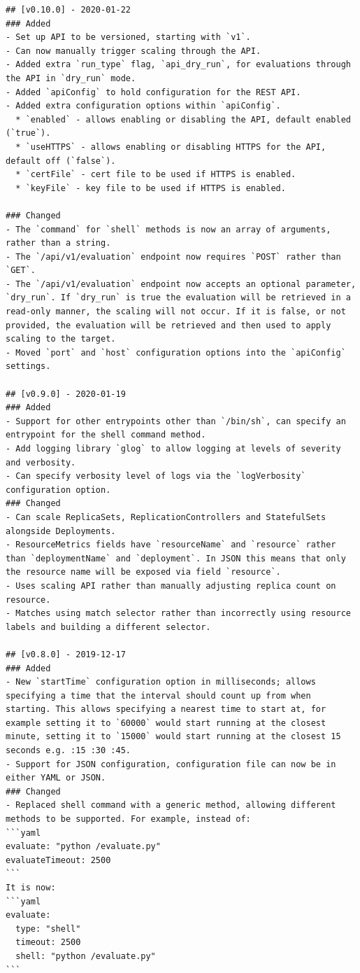 \begin{lstlisting}
## [v0.10.0] - 2020-01-22
### Added
- Set up API to be versioned, starting with `v1`.
- Can now manually trigger scaling through the API.
- Added extra `run_type` flag, `api_dry_run`, for evaluations through the API in `dry_run` mode.
- Added `apiConfig` to hold configuration for the REST API.
- Added extra configuration options within `apiConfig`.
  * `enabled` - allows enabling or disabling the API, default enabled (`true`).
  * `useHTTPS` - allows enabling or disabling HTTPS for the API, default off (`false`).
  * `certFile` - cert file to be used if HTTPS is enabled.
  * `keyFile` - key file to be used if HTTPS is enabled.

### Changed
- The `command` for `shell` methods is now an array of arguments, rather than a string.
- The `/api/v1/evaluation` endpoint now requires `POST` rather than `GET`.
- The `/api/v1/evaluation` endpoint now accepts an optional parameter, `dry_run`. If `dry_run` is true the evaluation will be retrieved in a read-only manner, the scaling will not occur. If it is false, or not provided, the evaluation will be retrieved and then used to apply scaling to the target.
- Moved `port` and `host` configuration options into the `apiConfig` settings.

## [v0.9.0] - 2020-01-19
### Added
- Support for other entrypoints other than `/bin/sh`, can specify an entrypoint for the shell command method.
- Add logging library `glog` to allow logging at levels of severity and verbosity.
- Can specify verbosity level of logs via the `logVerbosity` configuration option.
### Changed
- Can scale ReplicaSets, ReplicationControllers and StatefulSets alongside Deployments.
- ResourceMetrics fields have `resourceName` and `resource` rather than `deploymentName` and `deployment`. In JSON this means that only the resource name will be exposed via field `resource`.
- Uses scaling API rather than manually adjusting replica count on resource.
- Matches using match selector rather than incorrectly using resource labels and building a different selector.

## [v0.8.0] - 2019-12-17
### Added
- New `startTime` configuration option in milliseconds; allows specifying a time that the interval should count up from when starting. This allows specifying a nearest time to start at, for example setting it to `60000` would start running at the closest minute, setting it to `15000` would start running at the closest 15 seconds e.g. :15 :30 :45.
- Support for JSON configuration, configuration file can now be in either YAML or JSON.
### Changed
- Replaced shell command with a generic method, allowing different methods to be supported. For example, instead of:
```yaml
evaluate: "python /evaluate.py"
evaluateTimeout: 2500
```
It is now:
```yaml
evaluate: 
  type: "shell"
  timeout: 2500
  shell: "python /evaluate.py"
```


\end{lstlisting}
